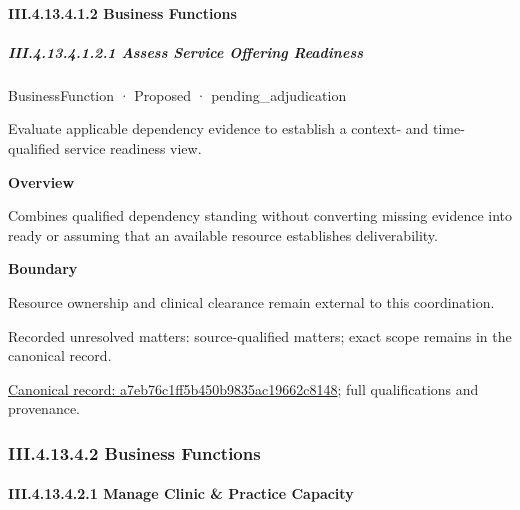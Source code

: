 \paragraph*{III.4.13.4.1.2 Business Functions}
\label{navigation:III.4.13.4.1.2}

\subparagraph*{III.4.13.4.1.2.1 Assess Service Offering Readiness}
\label{navigation:III.4.13.4.1.2.1}

\label{element:a7eb76c1ff5b450b9835ac19662c8148}
{\small BusinessFunction · Proposed · pending\_adjudication}\par

Evaluate applicable dependency evidence to establish a context- and time-qualified service readiness view.



\textbf{Overview}



Combines qualified dependency standing without converting missing evidence into ready or assuming that an available resource establishes deliverability.



\textbf{Boundary}



Resource ownership and clinical clearance remain external to this coordination.


{\small Recorded unresolved matters: source-qualified matters; exact scope remains in the canonical record.}\par
{\footnotesize \href{../../../../continuum/business/business-function/a7eb76c1ff5b450b9835ac19662c8148.md}{Canonical record: a7eb76c1ff5b450b9835ac19662c8148}; full qualifications and provenance.}\par
\subsubsection*{III.4.13.4.2 Business Functions}
\label{navigation:III.4.13.4.2}

\paragraph*{III.4.13.4.2.1 Manage Clinic \& Practice Capacity}
\label{navigation:III.4.13.4.2.1}

